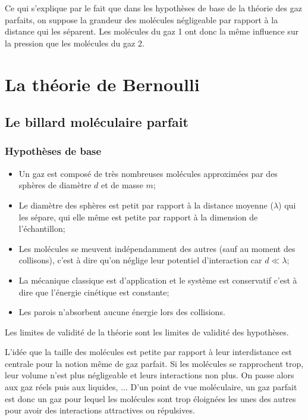 Ce qui s'explique par le fait que dans les hypothèses de base
de la théorie des gaz parfaits, on suppose la grandeur des molécules
négligeable par rapport à la distance qui les séparent.
Les molécules du gaz 1 ont donc la même influence sur la pression que
les molécules du gaz 2.

\section{La théorie de Bernoulli}
\subsection{Le billard moléculaire parfait}
\subsubsection{Hypothèses de base}
\begin{itemize}
  \item Un gaz est composé de très nombreuses molécules approximées
    par des sphères de diamètre $d$ et de masse $m$;
  \item Le diamètre des sphères est petit par rapport
    à la distance moyenne ($\lambda$) qui les sépare, qui elle même est petite
    par rapport à la dimension de l'échantillon;
  \item Les molécules se meuvent indépendamment des autres (sauf au moment des collisons),
    c'est à dire qu'on néglige leur potentiel d'interaction car $d \ll \lambda$;
  \item La mécanique classique est d'application et le système est conservatif
    c'est à dire que l'énergie cinétique est constante;
  \item Les parois n'absorbent aucune énergie lors des collisions.
\end{itemize}
Les limites de validité de la théorie sont
les limites de validité des hypothèses.

L'idée que la taille des molécules est petite par rapport à leur interdistance
est centrale pour la notion même de gaz parfait.
Si les molécules se rapprochent trop,
leur volume n'est plus négligeable et leurs interactions non plus.
On passe alors aux gaz réels puis aux liquides, ...
D'un point de vue moléculaire,
un gaz parfait est donc un gaz pour lequel les molécules sont
trop éloignées les unes des autres pour avoir des interactions attractives ou
répulsives.

